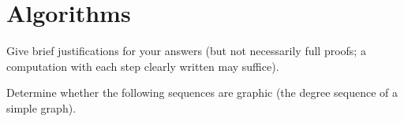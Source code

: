 \documentclass[addpoints,10pt]{exam}
\newenvironment{graph}[1][scale=1]{
\begin{tikzpicture}[#1]
\tikzstyle{vertex}=[circle, draw, fill, inner sep=0pt, minimum size=4pt]%
\tikzstyle{bigvtx}=[circle, draw, fill, inner sep=0pt, minimum size=6pt]%
\tikzstyle{every path}=[line width=0.5pt]%
}{\end{tikzpicture}}
\newcounter{savedqn}
\begin{document}
\section*{Algorithms}
Give brief justifications for your answers (but not necessarily full proofs; a computation with each step clearly written may suffice).

\begin{questions}
\setcounter{question}{\thesavedqn}

\question[12] Determine whether the following sequences are graphic (the degree sequence of a simple graph).

%
%


\end{questions}
\end{document}
